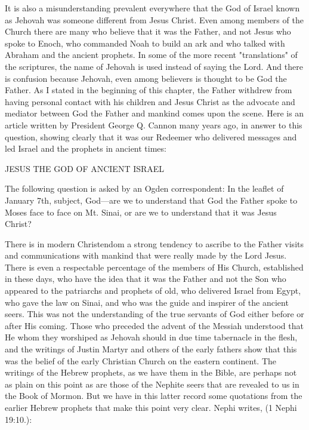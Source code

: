 It is also a misunderstanding prevalent everywhere that the God of Israel known as Jehovah
was someone different from Jesus Christ. Even among members of the Church there are
many who believe that it was the Father, and not Jesus who spoke to Enoch, who
commanded Noah to build an ark and who talked with Abraham and the ancient prophets. In
some of the more recent "translations" of the scriptures, the name of Jehovah is used instead
of saying the Lord. And there is confusion because Jehovah, even among believers is thought
to be God the Father. As I stated in the beginning of this chapter, the Father withdrew from
having personal contact with his children and Jesus Christ as the advocate and mediator
between God the Father and mankind comes upon the scene. Here is an article written by
President George Q. Cannon many years ago, in answer to this question, showing clearly that
it was our Redeemer who delivered messages and led Israel and the prophets in ancient
times:

JESUS THE GOD OF ANCIENT ISRAEL

The following question is asked by an Ogden correspondent: In the leaflet of January 7th,
subject, God—are we to understand that God the Father spoke to Moses face to face on Mt.
Sinai, or are we to understand that it was Jesus Christ?

There is in modern Christendom a strong tendency to ascribe to the Father visits and
communications with mankind that were really made by the Lord Jesus. There is even a
respectable percentage of the members of His Church, established in these days, who have
the idea that it was the Father and not the Son who appeared to the patriarchs and prophets of
old, who delivered Israel from Egypt, who gave the law on Sinai, and who was the guide and
inspirer of the ancient seers. This was not the understanding of the true servants of God either
before or after His coming. Those who preceded the advent of the Messiah understood that
He whom they worshiped as Jehovah should in due time tabernacle in the flesh, and the
writings of Justin Martyr and others of the early fathers show that this was the belief of the
early Christian Church on the eastern continent. The writings of the Hebrew prophets, as we
have them in the Bible, are perhaps not as plain on this point as are those of the Nephite seers
that are revealed to us in the Book of Mormon. But we have in this latter record some
quotations from the earlier Hebrew prophets that make this point very clear. Nephi writes, (1
Nephi 19:10.):

